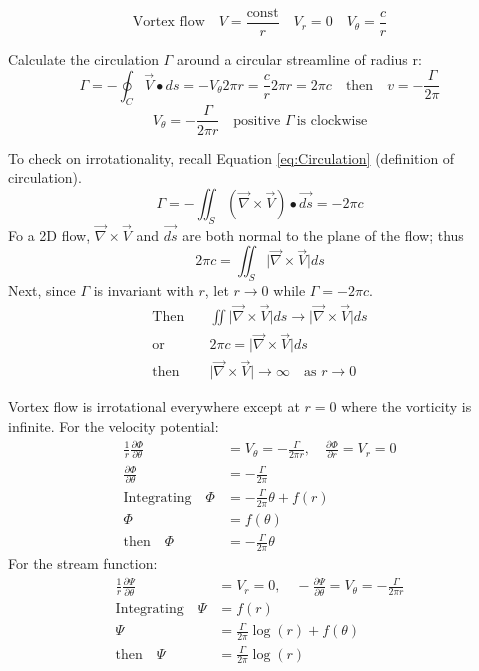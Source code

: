 \documentclass[draft=false, titlepage]{article}
\newcommand{\gradient}{\vec{\nabla}}
\newcommand{\partialfrac}[2]{\frac{\partial #1}{\partial #2}}
\begin{document}
\begin{equation}
    \text{Vortex flow} \quad V = \frac{\text{const}}{r} \quad V_r = 0 \quad V_\theta = \frac{c}{r}
     \label{eq:VortexFlow}
\end{equation}
 
 Calculate the circulation $\Gamma$ around a circular streamline of radius r:
 \begin{equation*}
     \Gamma = -\oint_C \vec{V} \bullet ds = -V_\theta 2\pi r = \frac{c}{r} 2\pi r = 2\pi c \quad \text{then} \quad v = -\frac{\Gamma}{2\pi}
 \end{equation*}
 \begin{equation*}
     \boxed{V_\theta= -\frac{\Gamma}{2\pi r}} \quad \text{positive } \Gamma\ \text{is clockwise}
 \end{equation*}
 
 To check on irrotationality, recall Equation \ref{eq:Circulation} (definition of circulation).
 \begin{equation*}
     \Gamma = -\iint_S (\gradient \times \vec{V}) \bullet \vec{ds} = -2\pi c
 \end{equation*}
 Fo a 2D flow, $\gradient \times \vec{V}$ and $\vec{ds}$ are both normal to the plane of the flow; thus
 \begin{equation*}
     2\pi c = \iint_S \big| \gradient \times \vec{V} \big| ds
 \end{equation*}
 Next, since $\Gamma$ is invariant with $r$, let $r \rightarrow 0$ while $\Gamma = -2\pi c$.
 \begin{align*}
     \text{Then} \quad & \iint \big| \gradient \times \vec{V} \big| ds \rightarrow \big| \gradient \times \vec{V} \big| ds\\
     \text{or} \quad & 2\pi c = \big| \gradient \times \vec{V} \big| ds\\
     \text{then} \quad & \big| \gradient \times \vec{V} \big| \rightarrow \infty \quad \text{as } r \rightarrow 0
 \end{align*}
 
 Vortex flow is irrotational everywhere except at $r=0$ where the vorticity is infinite.
 For the velocity potential:
 \begin{align*}
     \frac{1}{r} \partialfrac{\Phi}{\theta} &= V_\theta = -\frac{\Gamma}{2\pi r}, \quad \partialfrac{\Phi}{r} = V_r = 0\\
     \partialfrac{\Phi}{\theta} &= -\frac{\Gamma}{2\pi} \\
     \text{Integrating} \quad \Phi &=-\frac{\Gamma}{2\pi}\theta + f(r)\\
     \Phi & = f(\theta) \\
     \text{then} \quad \Phi &= -\frac{\Gamma}{2\pi}\theta 
 \end{align*}
 For the stream function:
 \begin{align*}
     \frac{1}{r} \partialfrac{\Psi}{\theta} &=V_r = 0,\quad -\partialfrac{\Psi}{\theta} = V_\theta = -\frac{\Gamma}{2\pi r}\\
     \text{Integrating} \quad \Psi &= f(r) \\
     \Psi & = \frac{\Gamma}{2\pi}\log(r) + f(\theta)\\
     \text{then} \quad \Psi &= \frac{\Gamma}{2\pi}\log(r)
 \end{align*}
 
\end{document}

